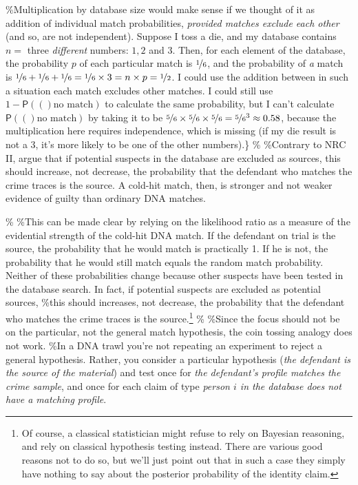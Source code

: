 \documentclass[10pt,dvipsnames,enabledeprecatedfontcommands]{scrartcl}
\newcommand{\pr}[1]{\mathsf{P}(#1)}
\begin{document}
\%Multiplication by database size would make sense if we thought of it
as addition of individual match probabilities,
\emph{provided matches exclude each other} (and so, are not
independent). Suppose I toss a die, and my database contains \(n=\)
three \emph{different} numbers: \(1, 2\) and \(3\). Then, for each
element of the database, the probability \(p\) of each particular match
is \(\nicefrac{1}{6}\), and the probability of \emph{a} match is
\(\nicefrac{1}{6}+\nicefrac{1}{6}+\nicefrac{1}{6}=\nicefrac{1}{6}\times 3 = n\times p =\nicefrac{1}{2}\).
I could use the addition between in such a situation each match excludes
other matches. I could still use \(1-\pr(\textrm{no match})\) to
calculate the same probability, but I can't calculate
\(\pr(\textrm{no match})\) by taking it to be
\(\nicefrac{5}{6}\times \nicefrac{5}{6}\times \nicefrac{5}{6} = \nicefrac{5}{6}^3 \approx 0.58\),
because the multiplication here requires independence, which is missing
(if my die result is not a 3, it's more likely to be one of the other
numbers).\} \% \%Contrary to NRC II,
\cite{donnelly1999DNADatabaseSearches} argue that if potential suspects
in the database are excluded as sources, this should increase, not
decrease, the probability that the defendant who matches the crime
traces is the source. A cold-hit match, then, is stronger and not weaker
evidence of guilty than ordinary DNA matches.

\% \%This can be made clear by relying on the likelihood ratio as a
measure of the evidential strength of the cold-hit DNA match. If the
defendant on trial is the source, the probability that he would match is
practically 1. If he is not, the probability that he would still match
equals the random match probability. Neither of these probabilities
change because other suspects have been tested in the database search.
In fact, if potential suspects are excluded as potential sources, \%this
should increases, not decrease, the probability that the defendant who
matches the crime traces is the
source.\footnote{Of course, a classical statistician might refuse to rely on Bayesian reasoning, and rely on classical hypothesis testing instead. There are various good reasons not to do so, but we'll just point out that in such a case they simply have nothing to say about the posterior probability of the identity claim.}
\% \%Since the focus should not be on the particular, not the general
match hypothesis, the coin tossing analogy does not work. \%In a DNA
trawl you're not repeating an experiment to reject a general hypothesis.
Rather, you consider a particular hypothesis
(\emph{the defendant is the source of the material}) and test once for
\emph{the defendant's profile matches the crime sample}, and once for
each claim of type
\emph{person $i$ in the database does not have a matching profile}.
\end{document}
